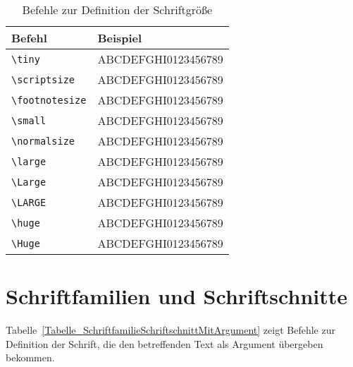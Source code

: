 \begin{table}[htb]
\centering
\caption{Befehle zur Definition der Schriftgröße}
\label{Tabelle_Schriftgroesse}       %
\begin{tabular}{ll}
\hline
Befehl & Beispiel \\
\hline
\texttt{\textbackslash tiny} & {\tiny ABCDEFGHI0123456789} \\
\texttt{\textbackslash scriptsize} & {\scriptsize ABCDEFGHI0123456789} \\
\texttt{\textbackslash footnotesize} & {\footnotesize ABCDEFGHI0123456789} \\
\texttt{\textbackslash small} & {\small ABCDEFGHI0123456789} \\
\texttt{\textbackslash normalsize} & {\normalsize ABCDEFGHI0123456789} \\
\texttt{\textbackslash large} & {\large ABCDEFGHI0123456789} \\
\texttt{\textbackslash Large} & {\Large ABCDEFGHI0123456789} \\
\texttt{\textbackslash LARGE} & {\LARGE ABCDEFGHI0123456789} \\
\texttt{\textbackslash huge} & {\huge ABCDEFGHI0123456789} \\
\texttt{\textbackslash Huge} & {\Huge ABCDEFGHI0123456789} \\
\hline
\end{tabular}
\end{table}

\section{Schriftfamilien und Schriftschnitte}
\label{AbschnittSchriftfamilienSchriftschnitte}

Tabelle~\ref{Tabelle_SchriftfamilieSchriftschnittMitArgument} zeigt Befehle zur Definition der Schrift, die den betreffenden Text als Argument übergeben bekommen.

